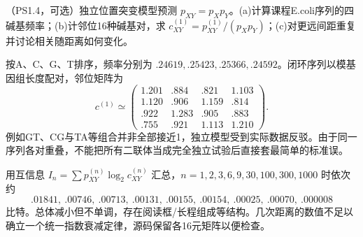 \begin{exercise}
（PS1.4，可选）独立位置突变模型预测 $p_{XY}=p_Xp_Y$。(a)计算课程E.coli序列的四碱基频率；(b)计邻位16种碱基对，求 $c_{XY}^{(1)}=p_{XY}^{(1)}/(p_Xp_Y)$；(c)对更远间距重复并讨论相关随距离如何变化。
\end{exercise}
\begin{solution}
按A、C、G、T排序，频率分别为 $.24619,.25423,.25366,.24592$。闭环序列以模基因组长度配对，邻位矩阵为
\[
c^{(1)}\simeq\begin{pmatrix}
1.201&.884&.821&1.103\\1.120&.906&1.159&.814\\.922&1.283&.905&.883\\.755&.921&1.113&1.210
\end{pmatrix}.
\]
例如GT、CG与TA等组合并非全部接近1，独立模型受到实际数据反驳。由于同一序列各对重叠，不能把所有二联体当成完全独立试验后直接套最简单的标准误。

用互信息 $I_n=\sum p_{XY}^{(n)}\log_2c_{XY}^{(n)}$ 汇总，$n=1,2,3,6,9,30,100,300,1000$ 时依次约 \[.01841,\ .00746,\ .00713,\ .00131,\ .00155,\ .00154,\ .00025,\ .00070,\ .000008\] 比特。总体减小但不单调，存在阅读框/长程组成等结构。几次距离的数值不足以确立一个统一指数衰减定律，源码保留各16元矩阵以便检查。
\end{solution}

